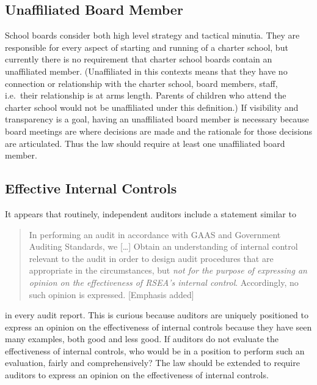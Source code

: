 \subsection{Unaffiliated Board Member}%
\label{sec:unaff-board-memb}\indent%

School boards consider both high level strategy and tactical minutia. They are responsible for every aspect of starting and running of a charter school, but currently there is no requirement that charter school boards contain an unaffiliated member. (Unaffiliated in this contexts means that they have no connection or relationship with the charter school, board members, staff, i.e.\ their relationship is at arms length. Parents of children who attend the charter school would not be unaffiliated under this definition.) If visibility and transparency is a goal, having an unaffiliated board member is necessary because board meetings are where decisions are made and the rationale for those decisions are articulated. Thus the law should require at least one unaffiliated board member.

\subsection{Effective Internal Controls}%
\label{sec:effect-intern-contr}\indent%

It appears that routinely, independent auditors include a statement similar to
\begin{quotation}\noindent
  In performing an audit in accordance with GAAS and Government Auditing Standards, we [\ldots]
  Obtain an understanding of internal control relevant to the audit in order to design audit procedures that are appropriate in the circumstances, but \textit{not for the purpose of expressing an opinion on the effectiveness of RSEA’s internal control}. Accordingly, no such opinion is expressed. [Emphasis added]
\end{quotation}
in every audit report. This is curious because auditors are uniquely positioned to express an opinion on the effectiveness of internal controls because they have seen many examples, both good and less good. If auditors do not evaluate the effectiveness of internal controls, who would be in a position to perform such an evaluation, fairly and comprehensively? The law should be extended to require auditors to express an opinion on the effectiveness of internal controls.

